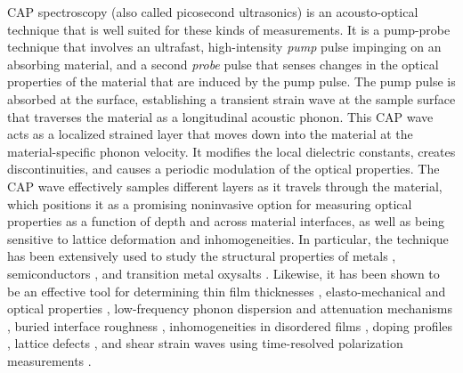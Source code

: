 \documentclass[pss]{wiley2sp} %
\begin{document}
CAP spectroscopy (also called picosecond ultrasonics) is an acousto-optical
technique that is well suited for these kinds of measurements. It is a
pump-probe technique
\cite{thomsenPRL84,thomsenPRB86,grahnJQE89,linJAP91,pfeiferPRL92} that involves
an ultrafast, high-intensity \emph{pump} pulse impinging on an absorbing
material, and a second \emph{probe} pulse that senses changes in the optical
properties of the material that are induced by the pump pulse. The pump pulse is
absorbed at the surface, establishing a transient strain wave at the sample
surface that traverses the material as a longitudinal acoustic phonon. This CAP
wave acts as a localized strained layer that moves down into the material at the
material-specific phonon velocity. It modifies the local dielectric constants,
creates discontinuities, and causes a periodic modulation of the optical
properties. The CAP wave effectively samples different layers as it travels
through the material, which positions it as a promising noninvasive option for
measuring optical properties as a function of depth and across material
interfaces, as well as being sensitive to lattice deformation and
inhomogeneities. In particular, the technique has been extensively used to study
the structural properties of metals \cite{rossignolPRL05,parkPRB05},
semiconductors
\cite{wuAPL06,matsudaPRL04,millerPRB06,wenAPL07,xuPSSC08,babilottePRB10,hudertJAP08},
and transition metal oxysalts
\cite{limAPL03,bozovicPRB04,ruelloPRB09,ruelloAPL12,chenAPL12}. Likewise, it has
been shown to be an effective tool for determining thin film thicknesses
\cite{gusevJAP11,matsudaJOSAB02}, elasto-mechanical
\cite{grahnAPL88a,grahnAPL88b,rossignolPRL05,taneiPRL08} and optical properties
\cite{qiPRB10,millerPRB06,xuPSSC08}, low-frequency phonon dispersion and
attenuation mechanisms \cite{zhuPRB91,dalyPRB09}, buried interface roughness
\cite{tasAPL98}, inhomogeneities in disordered films \cite{gusevJAP11}, doping
profiles \cite{hudertJAP08}, lattice defects
\cite{steigerwaldJAP12,steigerwaldAPL09,gregoryAPL12,baydinAPLP16}, and shear
strain waves using time-resolved polarization measurements
\cite{mounierEPJST08,mounierOE10}.
\end{document}
